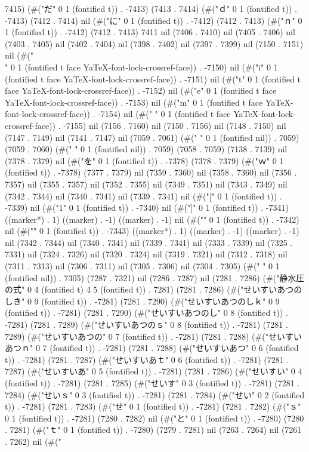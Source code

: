 {7415) (#("だ" 0 1 (fontified t)) . -7413) (7413 . 7414) (#("ｄ" 0 1 (fontified t)) . -7413) (7412 . 7414) nil (#("に" 0 1 (fontified t)) . -7412) (7412 . 7413) (#("ｎ" 0 1 (fontified t)) . -7412) (7412 . 7413) 7411 nil (7406 . 7410) nil (7405 . 7406) nil (7403 . 7405) nil (7402 . 7404) nil (7398 . 7402) nil (7397 . 7399) nil (7150 . 7151) nil (#("\\" 0 1 (fontified t face YaTeX-font-lock-crossref-face)) . -7150) nil (#("i" 0 1 (fontified t face YaTeX-font-lock-crossref-face)) . -7151) nil (#("t" 0 1 (fontified t face YaTeX-font-lock-crossref-face)) . -7152) nil (#("e" 0 1 (fontified t face YaTeX-font-lock-crossref-face)) . -7153) nil (#("m" 0 1 (fontified t face YaTeX-font-lock-crossref-face)) . -7154) nil (#(" " 0 1 (fontified t face YaTeX-font-lock-crossref-face)) . -7155) nil (7156 . 7160) nil (7150 . 7156) nil (7148 . 7150) nil (7147 . 7149) nil (7141 . 7147) nil (7059 . 7061) (#(" " 0 1 (fontified nil)) . 7059) (7059 . 7060) (#(" " 0 1 (fontified nil)) . 7059) (7058 . 7059) (7138 . 7139) nil (7378 . 7379) nil (#("を" 0 1 (fontified t)) . -7378) (7378 . 7379) (#("ｗ" 0 1 (fontified t)) . -7378) (7377 . 7379) nil (7359 . 7360) nil (7358 . 7360) nil (7356 . 7357) nil (7355 . 7357) nil (7352 . 7355) nil (7349 . 7351) nil (7343 . 7349) nil (7342 . 7344) nil (7340 . 7341) nil (7339 . 7341) nil (#("[" 0 1 (fontified t)) . -7339) nil (#("1" 0 1 (fontified t)) . -7340) nil (#("]" 0 1 (fontified t)) . -7341) ((marker*) . 1) ((marker) . -1) ((marker) . -1) nil (#("{" 0 1 (fontified t)) . -7342) nil (#("}" 0 1 (fontified t)) . -7343) ((marker*) . 1) ((marker) . -1) ((marker) . -1) nil (7342 . 7344) nil (7340 . 7341) nil (7339 . 7341) nil (7333 . 7339) nil (7325 . 7331) nil (7324 . 7326) nil (7320 . 7324) nil (7319 . 7321) nil (7312 . 7318) nil (7311 . 7313) nil (7306 . 7311) nil (7305 . 7306) nil (7304 . 7305) (#(" " 0 1 (fontified nil)) . 7305) (7287 . 7321) nil (7286 . 7287) nil (7281 . 7286) (#("静水圧の式" 0 4 (fontified t) 4 5 (fontified t)) . 7281) (7281 . 7286) (#("せいすいあつのしき" 0 9 (fontified t)) . -7281) (7281 . 7290) (#("せいすいあつのしｋ" 0 9 (fontified t)) . -7281) (7281 . 7290) (#("せいすいあつのし" 0 8 (fontified t)) . -7281) (7281 . 7289) (#("せいすいあつのｓ" 0 8 (fontified t)) . -7281) (7281 . 7289) (#("せいすいあつの" 0 7 (fontified t)) . -7281) (7281 . 7288) (#("せいすいあつｎ" 0 7 (fontified t)) . -7281) (7281 . 7288) (#("せいすいあつ" 0 6 (fontified t)) . -7281) (7281 . 7287) (#("せいすいあｔ" 0 6 (fontified t)) . -7281) (7281 . 7287) (#("せいすいあ" 0 5 (fontified t)) . -7281) (7281 . 7286) (#("せいすい" 0 4 (fontified t)) . -7281) (7281 . 7285) (#("せいす" 0 3 (fontified t)) . -7281) (7281 . 7284) (#("せいｓ" 0 3 (fontified t)) . -7281) (7281 . 7284) (#("せい" 0 2 (fontified t)) . -7281) (7281 . 7283) (#("せ" 0 1 (fontified t)) . -7281) (7281 . 7282) (#("ｓ" 0 1 (fontified t)) . -7281) (7280 . 7282) nil (#("と" 0 1 (fontified t)) . -7280) (7280 . 7281) (#("ｔ" 0 1 (fontified t)) . -7280) (7279 . 7281) nil (7263 . 7264) nil (7261 . 7262) nil (#("
}
